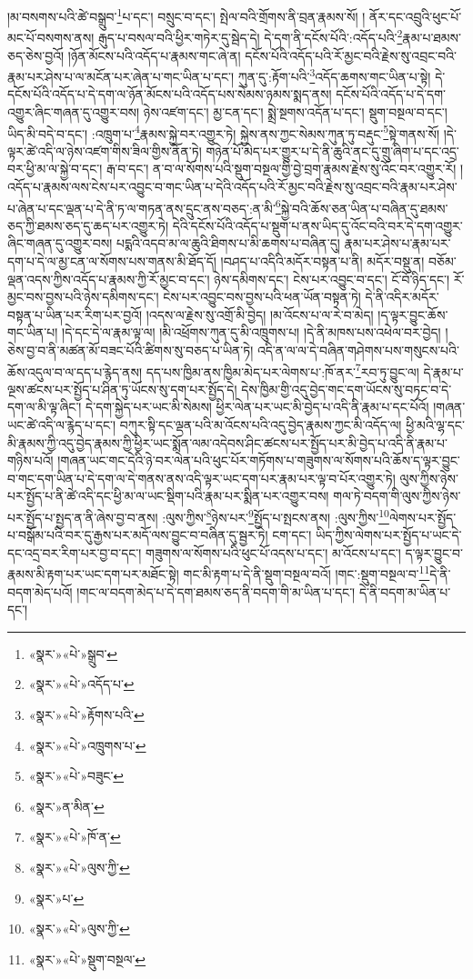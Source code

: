 །མ་བསགས་པའི་ཚེ་བསྒྲུབ་\footnote{«སྣར་»«པེ་»སྒྲུབ་}པ་དང་། བསྲུང་བ་དང་། སྤེལ་བའི་གྲོགས་ནི་བྲན་རྣམས་སོ། །
ནོར་དང་འབྲུའི་ཕུང་པོ་མང་པོ་བསགས་ནས། རྒུད་པ་བསལ་བའི་ཕྱིར་གཏེར་དུ་སྦེད་དེ། དེ་དག་ནི་དངོས་པོའི་:འདོད་པའི་\footnote{«སྣར་»«པེ་»འདོད་པ་}རྣམ་པ་ཐམས་ཅད་ཅེས་བྱའོ། །ཉོན་མོངས་པའི་འདོད་པ་རྣམས་གང་ཞེ་ན། དངོས་པོའི་འདོད་པའི་རོ་མྱང་བའི་རྗེས་སུ་འབྲང་བའི་རྣམ་པར་ཤེས་པ་ལ་མངོན་པར་ཞེན་པ་གང་ཡིན་པ་དང་། ཀུན་དུ་:རྟོག་པའི་\footnote{«སྣར་»«པེ་»རྟོགས་པའི་}འདོད་ཆགས་གང་ཡིན་པ་སྟེ། དེ་དངོས་པོའི་འདོད་པ་དེ་དག་ལ་ཉོན་མོངས་པའི་འདོད་པས་སེམས་ཉམས་སྨད་ནས། དངོས་པོའི་འདོད་པ་དེ་དག་འགྱུར་ཞིང་གཞན་དུ་འགྱུར་བས། ཉེས་འཛག་དང་། མྱ་ངན་དང་། སྨྲེ་སྔགས་འདོན་པ་དང་། སྡུག་བསྔལ་བ་དང་། ཡིད་མི་བདེ་བ་དང་། :འཁྲུག་པ་\footnote{«སྣར་»«པེ་»འཁྲུགས་པ་}རྣམས་སྐྱེ་བར་འགྱུར་ཏེ། སྐྱེས་ནས་ཀྱང་སེམས་ཀུན་ཏུ་བརྡུང་\footnote{«སྣར་»«པེ་»བཟུང་}སྟེ་གནས་སོ། །དེ་ལྟར་ཚེ་འདི་ལ་ཉེས་འཛག་གིས་ཟིལ་གྱིས་ནོན་ཏེ། གཉེན་པོ་མེད་པར་གྱུར་པ་དེ་ནི་ཆུའི་ནང་དུ་གྲུ་ཞིག་པ་དང་འདྲ་བར་ཕྱི་མ་ལ་སྐྱེ་བ་དང་། རྒ་བ་དང་། ན་བ་ལ་སོགས་པའི་སྡུག་བསྔལ་གྱི་བྱེ་བྲག་རྣམས་རྗེས་སུ་འོང་བར་འགྱུར་རོ། །འདོད་པ་རྣམས་ལས་ངེས་པར་འབྱུང་བ་གང་ཡིན་པ་དེའི་འདོད་པའི་རོ་མྱང་བའི་རྗེས་སུ་འབྲང་བའི་རྣམ་པར་ཤེས་པ་ཞེན་པ་དང་ལྡན་པ་དེ་ནི་ཏ་ལ་གཏན་ནས་དྲུང་ནས་བཅད་:ན་མི་\footnote{«སྣར་»ན་མིན་}སྐྱེ་བའི་ཆོས་ཅན་ཡིན་པ་བཞིན་དུ་ཐམས་ཅད་ཀྱི་ཐམས་ཅད་དུ་ཆད་པར་འགྱུར་ཏེ། དེའི་དངོས་པོའི་འདོད་པ་སྡུག་པ་ནས་ཡིད་དུ་འོང་བའི་བར་དེ་དག་འགྱུར་ཞིང་གཞན་དུ་འགྱུར་བས། པདྨའི་འདབ་མ་ལ་ཆུའི་ཐིགས་པ་མི་ཆགས་པ་བཞིན་དུ། རྣམ་པར་ཤེས་པ་རྣམ་པར་དག་པ་དེ་ལ་མྱ་ངན་ལ་སོགས་པས་གནས་མི་ཐོད་དོ། །བཤད་པ་འདིའི་མདོར་བསྟན་པ་ནི། མདོར་བསྡུ་ན། བཅོམ་ལྡན་འདས་ཀྱིས་འདོད་པ་རྣམས་ཀྱི་རོ་མྱང་བ་དང་། ཉེས་དམིགས་དང་། ངེས་པར་འབྱུང་བ་དང་། ངོ་བོ་ཉིད་དང་། རོ་མྱང་བས་བྱས་པའི་ཉེས་དམིགས་དང་། ངེས་པར་འབྱུང་བས་བྱས་པའི་ཕན་ཡོན་བསྟན་ཏེ། དེ་ནི་འདིར་མདོར་བསྟན་པ་ཡིན་པར་རིག་པར་བྱའོ། །འདས་ལ་རྗེས་སུ་འགྲོ་མི་བྱེད། །མ་འོངས་པ་ལ་རེ་བ་མེད། །ད་ལྟར་བྱུང་ཆོས་གང་ཡིན་པ། །དེ་དང་དེ་ལ་རྣམ་ལྟ་ལ། །མི་འཕྲོགས་ཀུན་དུ་མི་འཁྲུགས་པ། །དེ་ནི་མཁས་པས་འཕེལ་བར་བྱེད། །ཅེས་བྱ་བ་ནི་མཚན་མོ་བཟང་པོའི་ཚིགས་སུ་བཅད་པ་ཡིན་ཏེ། འདི་ན་ལ་ལ་དེ་བཞིན་གཤེགས་པས་གསུངས་པའི་ཆོས་འདུལ་བ་ལ་དད་པ་རྙེད་ནས། དད་པས་ཁྱིམ་ནས་ཁྱིམ་མེད་པར་ལེགས་པ་:ཁོ་ནར་\footnote{«སྣར་»«པེ་»ཁོ་ན་}རབ་ཏུ་བྱུང་ལ། དེ་རྣམ་པ་ལྔས་ཚངས་པར་སྤྱོད་པ་ཤིན་ཏུ་ཡོངས་སུ་དག་པར་སྤྱོད་དེ། དེས་ཁྱིམ་གྱི་འདུ་བྱེད་གང་དག་ཡོངས་སུ་བཏང་བ་དེ་དག་ལ་མི་ལྟ་ཞིང་། དེ་དག་སྐྱེད་པར་ཡང་མི་སེམས། ཕྱིར་ལེན་པར་ཡང་མི་བྱེད་པ་འདི་ནི་རྣམ་པ་དང་པོའོ། །གཞན་ཡང་ཚེ་འདི་ལ་རྙེད་པ་དང་། བཀུར་སྟི་དང་ལྡན་པའི་མ་འོངས་པའི་འདུ་བྱེད་རྣམས་ཀྱང་མི་འདོད་ལ། ཕྱི་མའི་ལྷ་དང་མི་རྣམས་ཀྱི་འདུ་བྱེད་རྣམས་ཀྱི་ཕྱིར་ཡང་སྨོན་ལམ་འདེབས་ཤིང་ཚངས་པར་སྤྱོད་པར་མི་བྱེད་པ་འདི་ནི་རྣམ་པ་གཉིས་པའོ། །གཞན་ཡང་གང་དེའི་ཉེ་བར་ལེན་པའི་ཕུང་པོར་གཏོགས་པ་གཟུགས་ལ་སོགས་པའི་ཆོས་ད་ལྟར་བྱུང་བ་གང་དག་ཡིན་པ་དེ་དག་ལ་དེ་གནས་ནས་འདི་ལྟར་ཡང་དག་པར་རྣམ་པར་ལྟ་བ་པོར་འགྱུར་ཏེ། ལུས་ཀྱིས་ཉེས་པར་སྤྱོད་པ་ནི་ཚེ་འདི་དང་ཕྱི་མ་ལ་ཡང་སྡིག་པའི་རྣམ་པར་སྨིན་པར་འགྱུར་བས། གལ་ཏེ་བདག་གི་ལུས་ཀྱིས་ཉེས་པར་སྤྱོད་པ་སྤྱད་ན་ནི་ཞེས་བྱ་བ་ནས། :ལུས་ཀྱིས་\footnote{«སྣར་»«པེ་»ལུས་ཀྱི་}ཉེས་པར་\footnote{«སྣར་»པ་}སྤྱོད་པ་སྤངས་ནས། :ལུས་ཀྱིས་\footnote{«སྣར་»«པེ་»ལུས་ཀྱི་}ལེགས་པར་སྤྱོད་པ་བསྒོམ་པའི་བར་དུ་རྒྱས་པར་མདོ་ལས་བྱུང་བ་བཞིན་དུ་སྦྱར་ཏེ། ངག་དང་། ཡིད་ཀྱིས་ལེགས་པར་སྤྱོད་པ་ཡང་དེ་དང་འདྲ་བར་རིག་པར་བྱ་བ་དང་། གཟུགས་ལ་སོགས་པའི་ཕུང་པོ་འདས་པ་དང་། མ་འོངས་པ་དང་། ད་ལྟར་བྱུང་བ་རྣམས་མི་རྟག་པར་ཡང་དག་པར་མཐོང་སྟེ། གང་མི་རྟག་པ་དེ་ནི་སྡུག་བསྔལ་བའོ། །གང་:སྡུག་བསྔལ་བ་\footnote{«སྣར་»«པེ་»སྡུག་བསྔལ་}དེ་ནི་བདག་མེད་པའོ། །གང་ལ་བདག་མེད་པ་དེ་དག་ཐམས་ཅད་ནི་བདག་གི་མ་ཡིན་པ་དང་། དེ་ནི་བདག་མ་ཡིན་པ་དང་། 
